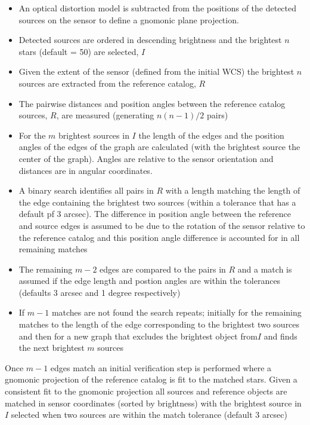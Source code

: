 \begin{itemize}
\item An optical distortion model is subtracted from the positions of
  the detected sources on the sensor to define a gnomonic plane projection.
\item Detected sources are ordered in descending brightness and the
  brightest $n$ stars (default = 50) are selected, $I$
\item Given the extent of the sensor (defined from the initial WCS)
  the brightest $n$ sources are extracted from the reference catalog, $R$
\item The pairwise distances and position angles between the reference
  catalog sources, $R$, are measured (generating $n(n-1)/2$ pairs)
\item For the $m$ brightest sources in $I$ the length of the edges and
  the position angles of the edges of the graph are calculated (with
  the brightest source the center of the graph). Angles are relative
  to the sensor orientation and distances are in angular coordinates.
\item A binary search identifies all pairs in $R$ with a length
  matching the length of the edge containing the brightest two sources
  (within a tolerance that has a default pf 3 arcsec).  The difference
  in position angle between the reference and source edges is assumed
  to be due to the rotation of the sensor relative to the reference
  catalog and this position angle difference is accounted for in all
  remaining matches
\item The remaining $m-2$ edges are compared to the pairs in $R$ and a
  match is assumed if the edge length and postion angles are within
  the tolerances (defaults 3 arcsec and 1 degree respectively)
\item If $m-1$ matches are not found the search repeats; initially for
  the remaining matches to the length of the edge corresponding to the
  brightest two sources and then for a new graph that excludes the
  brightest object from$I$ and finds the next brightest $m$ sources
\end{itemize} 

Once $m-1$ edges match an initial verification step is performed where a gnomonic projection of the reference catalog is fit to the matched stars. Given a consistent fit to the gnomonic projection all sources and reference objects are matched in sensor coordinates (sorted by brightness) with the brightest source in $I$ selected when two sources are within the match tolerance (default 3 arcsec)

